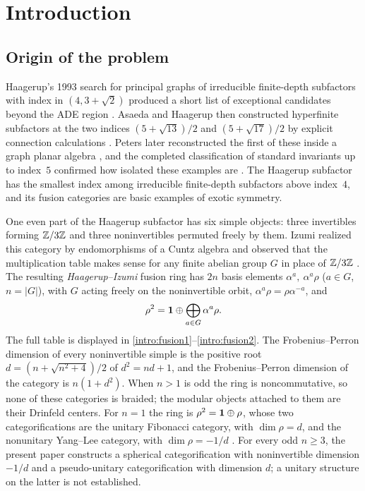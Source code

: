 \section{Introduction}
\label{sec:introduction}

\subsection*{Origin of the problem}

Haagerup's 1993 search for principal graphs of irreducible finite-depth
subfactors with index in $(4,3+\sqrt2)$ produced a short list of
exceptional candidates beyond the ADE region \cite{Haagerup}. Asaeda and
Haagerup then constructed hyperfinite subfactors at the two indices
$(5+\sqrt{13})/2$ and $(5+\sqrt{17})/2$ by explicit connection
calculations \cite{AH}. Peters later reconstructed the first of these
inside a graph planar algebra \cite{Peters}, and the completed
classification of standard invariants up to index~$5$ confirmed how
isolated these examples are \cite{JMS}. The Haagerup subfactor has the
smallest index among irreducible finite-depth subfactors above index~$4$,
and its fusion categories are basic examples of exotic symmetry.

One even part of the Haagerup subfactor has six simple objects: three
invertibles forming $\mathbb Z/3\mathbb Z$ and three noninvertibles permuted freely by
them. Izumi realized this category by endomorphisms of a Cuntz algebra
and observed that the multiplication table makes sense for any finite
abelian group $G$ in place of $\mathbb Z/3\mathbb Z$ \cite{Izumi2}. The resulting
\emph{Haagerup--Izumi} fusion ring has $2n$ basis elements
$\alpha^a,\ \alpha^a\rho$ ($a\in G$, $n=|G|$), with $G$ acting
freely on the noninvertible orbit, $\alpha^a\rho=\rho\alpha^{-a}$, and
\[
 \rho^2=\mathbf1\oplus\bigoplus_{a\in G}\alpha^a\rho .
\]
The full table is displayed in
\eqref{intro:fusion1}--\eqref{intro:fusion2}. The Frobenius--Perron
dimension of every noninvertible simple is the positive root
$d=(n+\sqrt{n^2+4})/2$ of $d^2=nd+1$, and the Frobenius--Perron
dimension of the category is $n(1+d^2)$. When $n>1$ is odd the ring is
noncommutative, so none of these
categories is braided; the modular objects attached to them are their
Drinfeld centers. For $n=1$ the ring is $\rho^2=\mathbf1\oplus\rho$, whose
two categorifications are the unitary Fibonacci category, with
$\dim\rho=d$, and the nonunitary Yang--Lee category, with
$\dim\rho=-1/d$ \cite{Ostrik2}. For every odd $n\ge3$, the present
paper constructs a spherical categorification with noninvertible
dimension $-1/d$ and a pseudo-unitary categorification with dimension
$d$; a unitary structure on the latter is not established.

